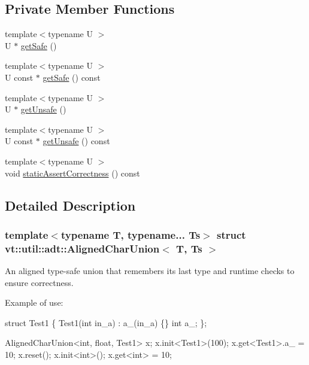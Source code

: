 \subsection*{Private Member Functions}
\begin{DoxyCompactItemize}
\item 
{\footnotesize template$<$typename U $>$ }\\U $\ast$ \hyperlink{structvt_1_1util_1_1adt_1_1_aligned_char_union_a58c0d0aaf061c92a89b33da6e84ea5d7}{get\+Safe} ()
\item 
{\footnotesize template$<$typename U $>$ }\\U const  $\ast$ \hyperlink{structvt_1_1util_1_1adt_1_1_aligned_char_union_a188460ee37c49aa3134d84ae728a2783}{get\+Safe} () const
\item 
{\footnotesize template$<$typename U $>$ }\\U $\ast$ \hyperlink{structvt_1_1util_1_1adt_1_1_aligned_char_union_a8440cff62cda9dcffc9e86de39d23d8f}{get\+Unsafe} ()
\item 
{\footnotesize template$<$typename U $>$ }\\U const  $\ast$ \hyperlink{structvt_1_1util_1_1adt_1_1_aligned_char_union_abfa5497bfe92bb4bda432da80c31137d}{get\+Unsafe} () const
\item 
{\footnotesize template$<$typename U $>$ }\\void \hyperlink{structvt_1_1util_1_1adt_1_1_aligned_char_union_a5be41aefcdc73b5f10102991b2aa8bfc}{static\+Assert\+Correctness} () const
\end{DoxyCompactItemize}


\subsection{Detailed Description}
\subsubsection*{template$<$typename T, typename... Ts$>$\newline
struct vt\+::util\+::adt\+::\+Aligned\+Char\+Union$<$ T, Ts $>$}

An aligned type-\/safe union that remembers its last type and runtime checks to ensure correctness. 

Example of use\+:


\begin{DoxyCode}
\textcolor{keyword}{struct }Test1 \{
  Test1(\textcolor{keywordtype}{int} in\_a) : a\_(in\_a) \{\}
  \textcolor{keywordtype}{int} a\_;
\};

AlignedCharUnion<int, float, Test1> x;
x.init<Test1>(100);
x.get<Test1>.a\_ = 10;
x.reset();
x.init<\textcolor{keywordtype}{int}>();
x.get<\textcolor{keywordtype}{int}> = 10;
\end{DoxyCode}
 

